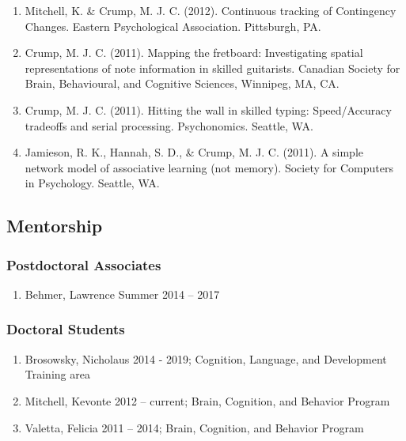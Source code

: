 \documentclass[11pt,a4paper,]{moderncv}
\providecommand{\tightlist}{%
	\setlength{\itemsep}{0pt}\setlength{\parskip}{0pt}}
\begin{document}
\begin{enumerate}
  Mitchell, K. \& Crump, M. J. C. (2012). Poverty, attention and the power of the default option. Society for Judgment and Decision Making, Minneapolis, MI.
\item
  Mitchell, K. \& Crump, M. J. C. (2012). Continuous tracking of Contingency Changes. Eastern Psychological Association. Pittsburgh, PA.
\item
  Crump, M. J. C. (2011). Mapping the fretboard: Investigating spatial representations of note information in skilled guitarists. Canadian Society for Brain, Behavioural, and Cognitive Sciences, Winnipeg, MA, CA.
\item
  Crump, M. J. C. (2011). Hitting the wall in skilled typing: Speed/Accuracy tradeoffs and serial processing. Psychonomics. Seattle, WA.
\item
  Jamieson, R. K., Hannah, S. D., \& Crump, M. J. C. (2011). A simple network model of associative learning (not memory). Society for Computers in Psychology. Seattle, WA.
\end{enumerate}

\hypertarget{mentorship}{%
\subsection{Mentorship}\label{mentorship}}

\hypertarget{postdoctoral-associates}{%
\subsubsection{Postdoctoral Associates}\label{postdoctoral-associates}}

\begin{enumerate}
\def\labelenumi{\arabic{enumi}.}
\tightlist
\item
  Behmer, Lawrence Summer 2014 -- 2017
\end{enumerate}

\hypertarget{doctoral-students}{%
\subsubsection{Doctoral Students}\label{doctoral-students}}

\begin{enumerate}
\def\labelenumi{\arabic{enumi}.}
\tightlist
\item
  Brosowsky, Nicholaus 2014 - 2019; Cognition, Language, and Development Training area
\item
  Mitchell, Kevonte 2012 -- current; Brain, Cognition, and Behavior Program
\item
  Valetta, Felicia 2011 -- 2014; Brain, Cognition, and Behavior Program
\end{enumerate}
\end{document}
